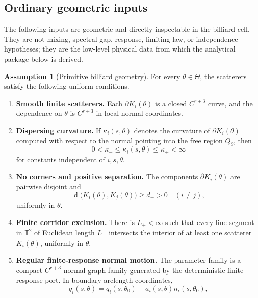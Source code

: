 \documentclass[12pt, letterpaper]{amsart}
\newcommand{\T}{\mathbb{T}}
\newcommand{\Thetacal}{\Theta}
\DeclareMathOperator{\dist}{d}
\theoremstyle{plain}
\theoremstyle{definition}
\newtheorem{assumption}[theorem]{Assumption}
\theoremstyle{remark}
\begin{document}
\subsection{Ordinary geometric inputs}
\label{subsec:ordinary_geometric_assumptions}

The following inputs are geometric and directly inspectable in the billiard cell.  They are not mixing, spectral-gap, response, limiting-law, or independence hypotheses; they are the low-level physical data from which the analytical package below is derived.

\begin{assumption}[Primitive billiard geometry]
\label{ass:fundamental_axioms_unified}
For every $\theta\in\Thetacal$, the scatterers satisfy the following uniform conditions.
\begin{enumerate}[label=(G\arabic*), wide, labelindent=0pt]
    \item \textbf{Smooth finite scatterers.}  Each $\partial K_i(\theta)$ is a closed $C^{r+3}$ curve, and the dependence on $\theta$ is $C^{r+3}$ in local normal coordinates.
    \item \textbf{Dispersing curvature.}  If $\kappa_i(s,\theta)$ denotes the curvature of $\partial K_i(\theta)$ computed with respect to the normal pointing into the free region $Q_\theta$, then
    \begin{equation}
        0<\kappa_-\le \kappa_i(s,\theta)\le \kappa_+<\infty
    \end{equation}
    for constants independent of $i,s,\theta$.
    \item \textbf{No corners and positive separation.}  The components $\partial K_i(\theta)$ are pairwise disjoint and
    \begin{equation}
        \dist\bigl(K_i(\theta),K_j(\theta)\bigr)\ge d_->0
        \quad (i\ne j),
    \end{equation}
    uniformly in $\theta$.
    \item \textbf{Finite corridor exclusion.}  There is $L_+<\infty$ such that every line segment in $\T^2$ of Euclidean length $L_+$ intersects the interior of at least one scatterer $K_i(\theta)$, uniformly in $\theta$.
    \item \textbf{Regular finite-response normal motion.}  The parameter family is a compact $C^{r+3}$ normal-graph family generated by the deterministic finite-response port.  In boundary arclength coordinates,
    \begin{equation}
        q_i(s,\theta)=q_i(s,\theta_0)+a_i(s,\theta)n_i(s,\theta_0),

\end{equation}
\end{enumerate}
\end{assumption}
\end{document}
